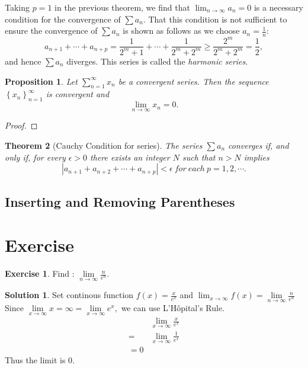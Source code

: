 \documentclass{article}
\newtheorem{theorem}{Theorem}[section]
\newtheorem{prop}[theorem]{Proposition}
\theoremstyle{definition}
\newtheorem{exe}{Exercise}[section]
\newtheorem{sol}{Solution}[exe]
\begin{document}
Taking $p=1$ in the previous theorem, we find that $\lim_{n\rightarrow \infty}a_{n}=0$ is 
a necessary condition for the convergence of $\sum a_{n}$. That this condition is not sufficient
to ensure the convergence of $\sum a_{n}$ is shown as follows as we choose $a_{n}=\frac{1}{n}$:
$$a_{n+1}+\cdots+a_{n+p}=\frac{1}{2^{m}+1}+\cdots+\frac{1}{2^{m}+2^{m}}\geq\frac{2^{m}}{2^{m}+2^{m}}=\frac{1}{2},$$
and hence $\sum a_{n}$ diverges. This series is called the \textit{harmonic series}.

\begin{prop}
    Let $\sum_{n=1}^{\infty}x_{n}$ be a convergent series. Then the sequence 
    $\left\{x_{n}\right\}_{n=1}^{\infty}$ is convergent and $$\lim_{n\rightarrow \infty}x_{n} = 0.$$
\end{prop}

\begin{proof}
    
\end{proof}



\begin{theorem}[Cauchy Condition for series]
    The series $\sum a_{n}$ converges if, and only if, for every $\epsilon>0$ there exists an integer $N$ such that $n>N$ implies
    $$|a_{n+1}+a_{n+2}+\cdots+a_{n+p}|<\epsilon\ for\ each\ p=1,2,\cdots.$$
\end{theorem}


\subsection{Inserting and Removing Parentheses}

\newpage
\section{Exercise}


\begin{exe}
Find : $\underset{n \to \infty}{\lim}\frac{n}{e^{n}}.$ 
\end{exe}
\begin{sol}
    Set continous function $f(x)=\frac{x}{e^{x}}$ and $\lim_{x\to \infty}f(x)=\underset{n \to \infty}{\lim}\frac{n}{e^{n}}$
Since $\underset{x \to \infty}{\lim}x=\infty=\underset{x \to \infty}{\lim}e^{x},$ we can use L'Hôpital's Rule.
\begin{align*}
    &\underset{x \to \infty}{\lim}\frac{x}{e^{x}}\\
    =& \underset{x \to \infty}{\lim}\frac{1}{e^{x}}\\
    =0
\end{align*}
Thus the limit is $0$.
\end{sol}
\end{document}
